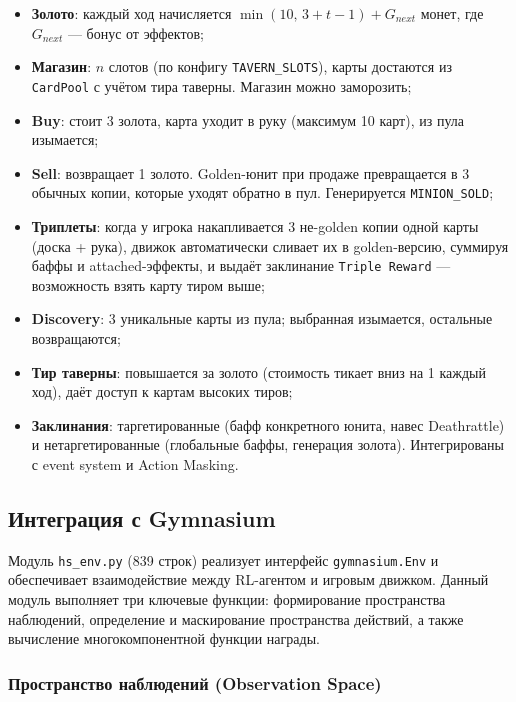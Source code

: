\documentclass[a4paper,12pt]{extarticle}
\begin{document}
\begin{itemize}[noitemsep]
  \item \textbf{Золото}: каждый ход начисляется $\min(10,\, 3 + t{-}1) + G_{next}$ монет, где $G_{next}$ --- бонус от эффектов;
  \item \textbf{Магазин}: $n$ слотов (по конфигу \texttt{TAVERN\_SLOTS}), карты достаются из \texttt{CardPool} с учётом тира таверны. Магазин можно заморозить;
  \item \textbf{Buy}: стоит 3 золота, карта уходит в руку (максимум 10 карт), из пула изымается;
  \item \textbf{Sell}: возвращает 1 золото. Golden-юнит при продаже превращается в 3 обычных копии, которые уходят обратно в пул. Генерируется \texttt{MINION\_SOLD};
  \item \textbf{Триплеты}: когда у игрока накапливается 3 не-golden копии одной карты (доска + рука), движок автоматически сливает их в golden-версию, суммируя баффы и attached-эффекты, и выдаёт заклинание \texttt{Triple Reward} --- возможность взять карту тиром выше;
  \item \textbf{Discovery}: 3 уникальные карты из пула; выбранная изымается, остальные возвращаются;
  \item \textbf{Тир таверны}: повышается за золото (стоимость тикает вниз на 1 каждый ход), даёт доступ к картам высоких тиров;
  \item \textbf{Заклинания}: таргетированные (бафф конкретного юнита, навес Deathrattle) и нетаргетированные (глобальные баффы, генерация золота). Интегрированы с event system и Action Masking.
\end{itemize}


\subsection{Интеграция с Gymnasium}

Модуль \texttt{hs\_env.py} (839 строк) реализует интерфейс \texttt{gymnasium.Env} и обеспечивает взаимодействие между RL-агентом и игровым движком. Данный модуль выполняет три ключевые функции: формирование пространства наблюдений, определение и маскирование пространства действий, а также вычисление многокомпонентной функции награды.

\subsubsection{Пространство наблюдений (Observation Space)}
\end{document}

